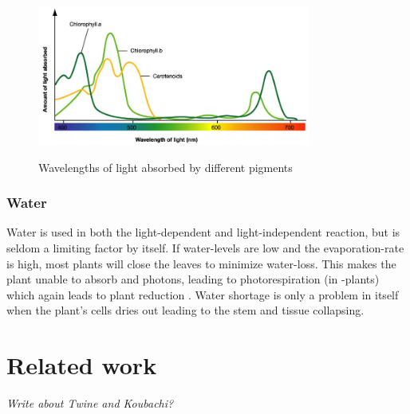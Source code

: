 \begin{figure}
        \centering
        \includegraphics[width=0.8\textwidth]{img/photosynthesis/absorption-spectrum.png}
        \caption{Wavelengths of light absorbed by different pigments}
        \citep{uicbiology}
        \label{fig:wavelengthabsorbtion}
\end{figure}

\subsubsection{Water}
Water is used in both the light-dependent and light-independent reaction, but is seldom a limiting factor by itself. If water-levels are low and the evaporation-rate is high, most plants will close the leaves to minimize water-loss. This makes the plant unable to absorb  and photons, leading to photorespiration (in -plants) which again leads to plant reduction \citep{bi2}. Water shortage is only a problem in itself when the plant’s cells dries out leading to the stem and tissue collapsing. 


\section{Related work}
\emph{Write about Twine and Koubachi?}